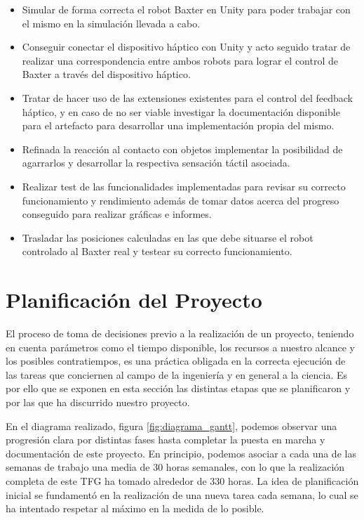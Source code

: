 \begin{itemize}
    \item Simular de forma correcta el robot Baxter en Unity para poder trabajar con el mismo en la simulación llevada a cabo. 
    \item Conseguir conectar el dispositivo háptico con Unity y acto seguido tratar de realizar una correspondencia entre ambos robots para lograr el control de Baxter a través del dispositivo háptico.
    \item Tratar de hacer uso de las extensiones existentes para el control del feedback háptico, y en caso de no ser viable investigar la documentación disponible para el artefacto para desarrollar una implementación propia del mismo.
    \item Refinada la reacción al contacto con objetos implementar la posibilidad de agarrarlos y desarrollar la respectiva sensación táctil asociada.
    \item Realizar test de las funcionalidades implementadas para revisar su correcto funcionamiento y rendimiento además de tomar datos acerca del progreso conseguido para realizar gráficas e informes.
    \item Trasladar las posiciones calculadas en las que debe situarse el robot controlado al Baxter real y testear su correcto funcionamiento.
\end{itemize}

\section{Planificación del Proyecto}
El proceso de toma de decisiones previo a la realización de un proyecto, teniendo en cuenta parámetros como el tiempo disponible, los recursos a nuestro alcance y los posibles contratiempos, es una práctica obligada en la correcta ejecución de las tareas que conciernen al campo de la ingeniería y en general a la ciencia. Es por ello que se exponen en esta sección las distintas etapas que se planificaron y por las que ha discurrido nuestro proyecto.

En el diagrama realizado, figura \ref{fig:diagrama_gantt}, podemos observar una progresión clara por distintas fases hasta completar la puesta en marcha y documentación de este proyecto. En principio, podemos asociar a cada una de las semanas de trabajo una media de 30 horas semanales, con lo que la realización completa de este TFG ha tomado alrededor de 330 horas. La idea de planificación inicial se fundamentó en la realización de una nueva tarea cada semana, lo cual se ha intentado respetar al máximo en la medida de lo posible.


